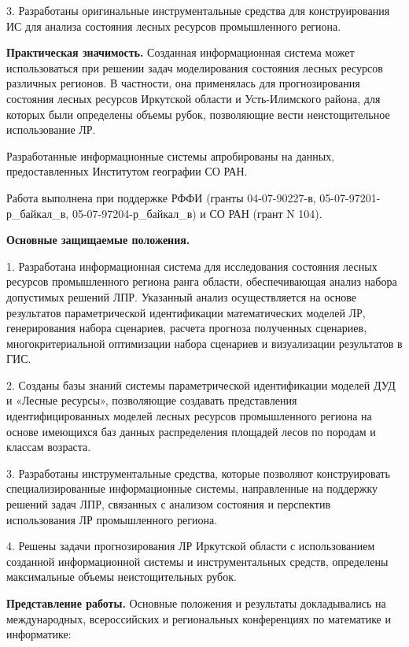 \documentclass{article}
\begin{document}
3. Разработаны оригинальные инструментальные 
средства для конструирования ИС для анализа 
состояния лесных ресурсов промышленного региона.

\textbf{Практическая значимость. }Созданная информационная 
система может использоваться при решении задач 
моделирования состояния лесных ресурсов различных 
регионов. В частности, она применялась для прогнозирования 
состояния лесных ресурсов Иркутской области 
и Усть-Илимского района, для которых были определены 
объемы рубок, позволяющие вести неистощительное 
использование ЛР.

Разработанные информационные системы апробированы 
на данных, предоставленных Институтом географии 
СО РАН.

Работа выполнена при поддержке РФФИ (гранты 
04-07-90227-в, 05-07-97201-р\_байкал\_в, 05-07-97204-р\_байкал\_в) 
и СО РАН (грант N 104).

\textbf{Основные защищаемые положения.} 

1. Разработана информационная система для исследования 
состояния лесных ресурсов промышленного региона 
ранга области, обеспечивающая анализ набора 
допустимых решений ЛПР. Указанный анализ осуществляется 
на основе результатов параметрической идентификации 
математических моделей ЛР, генерирования набора 
сценариев, расчета прогноза полученных сценариев, 
многокритериальной оптимизации набора сценариев 
и визуализации результатов в  ГИС.

2. Созданы базы знаний системы параметрической 
идентификации моделей ДУД и «Лесные ресурсы», 
позволяющие создавать представления идентифицированных 
моделей лесных ресурсов промышленного региона 
на основе имеющихся баз данных распределения 
площадей лесов по породам и классам возраста. 

3. Разработаны инструментальные средства, которые 
позволяют конструировать специализированные 
информационные системы, направленные на поддержку 
решений задач ЛПР, связанных с анализом состояния 
и перспектив использования ЛР промышленного 
региона.

4. Решены задачи прогнозирования ЛР Иркутской 
области с использованием  созданной информационной 
системы и инструментальных средств, определены 
максимальные объемы неистощительных рубок.

\textbf{Представление работы.} Основные положения 
и результаты докладывались на международных\label{OLEHLINK12}\label{OLEHLINK13}, 
всероссийских и региональных конференциях 
по математике и информатике:
\end{document}
